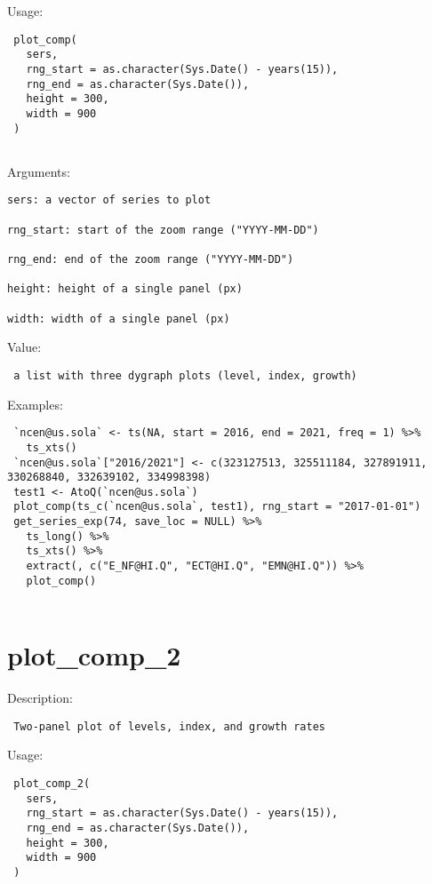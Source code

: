 \documentclass[
  letterpaper,
  DIV=11,
  numbers=noendperiod]{scrreport}
\begin{document}
Usage:

\begin{verbatim}
 plot_comp(
   sers,
   rng_start = as.character(Sys.Date() - years(15)),
   rng_end = as.character(Sys.Date()),
   height = 300,
   width = 900
 )
 
\end{verbatim}

Arguments:

\begin{verbatim}
sers: a vector of series to plot

rng_start: start of the zoom range ("YYYY-MM-DD")

rng_end: end of the zoom range ("YYYY-MM-DD")

height: height of a single panel (px)

width: width of a single panel (px)
\end{verbatim}

Value:

\begin{verbatim}
 a list with three dygraph plots (level, index, growth)
\end{verbatim}

Examples:

\begin{verbatim}
 `ncen@us.sola` <- ts(NA, start = 2016, end = 2021, freq = 1) %>% 
   ts_xts()
 `ncen@us.sola`["2016/2021"] <- c(323127513, 325511184, 327891911, 330268840, 332639102, 334998398)
 test1 <- AtoQ(`ncen@us.sola`)
 plot_comp(ts_c(`ncen@us.sola`, test1), rng_start = "2017-01-01")
 get_series_exp(74, save_loc = NULL) %>%
   ts_long() %>%
   ts_xts() %>%
   extract(, c("E_NF@HI.Q", "ECT@HI.Q", "EMN@HI.Q")) %>%
   plot_comp()
 
\end{verbatim}

\hypertarget{plot_comp_2}{%
\section{plot\_comp\_2}\label{plot_comp_2}}

Description:

\begin{verbatim}
 Two-panel plot of levels, index, and growth rates
\end{verbatim}

Usage:

\begin{verbatim}
 plot_comp_2(
   sers,
   rng_start = as.character(Sys.Date() - years(15)),
   rng_end = as.character(Sys.Date()),
   height = 300,
   width = 900
 )
 
\end{verbatim}
\end{document}
